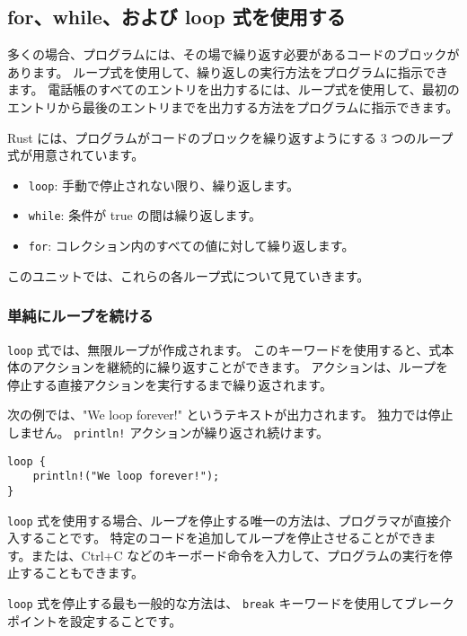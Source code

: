 \subsection{for、while、および loop 式を使用する}

多くの場合、プログラムには、その場で繰り返す必要があるコードのブロックがあります。 ループ式を使用して、繰り返しの実行方法をプログラムに指示できます。 電話帳のすべてのエントリを出力するには、ループ式を使用して、最初のエントリから最後のエントリまでを出力する方法をプログラムに指示できます。

Rust には、プログラムがコードのブロックを繰り返すようにする 3 つのループ式が用意されています。


\begin{itemize}

\item \texttt{loop}: 手動で停止されない限り、繰り返します。
\item \texttt{while}: 条件が true の間は繰り返します。
\item \texttt{for}: コレクション内のすべての値に対して繰り返します。

\end{itemize}

このユニットでは、これらの各ループ式について見ていきます。

\subsubsection{単純にループを続ける}

\texttt{loop} 式では、無限ループが作成されます。 このキーワードを使用すると、式本体のアクションを継続的に繰り返すことができます。 アクションは、ループを停止する直接アクションを実行するまで繰り返されます。

次の例では、"We loop forever!" というテキストが出力されます。 独力では停止しません。 \texttt{println!} アクションが繰り返され続けます。

\begin{lstlisting}[numbers=none]
loop {
    println!("We loop forever!");
}
\end{lstlisting}

\texttt{loop} 式を使用する場合、ループを停止する唯一の方法は、プログラマが直接介入することです。 特定のコードを追加してループを停止させることができます。または、Ctrl+C などのキーボード命令を入力して、プログラムの実行を停止することもできます。

\texttt{loop} 式を停止する最も一般的な方法は、 \texttt{break} キーワードを使用してブレーク ポイントを設定することです。

